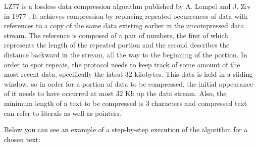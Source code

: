 LZ77 is a lossless data compression algorithm published by A. Lempel and J. Ziv
in 1977 \cite{lz77}. It achieves compression by replacing repeated occurrences
of data with references to a copy of the same data existing earlier in the
uncompressed data stream. The reference is composed of a pair of numbers, the
first of which represents the length of the repeated portion and the second
describes the distance backward in the stream, all the way to the beginning of
the portion. In order to spot repeats, the protocol needs to keep track of some
amount of the most recent data, specifically the latest 32 kilobytes. This data
is held in a sliding window, so in order for a portion of data to be compressed,
the initial appearance of it needs to have occurred at most 32 Kb up the data
stream. Also, the minimum length of a text to be compressed is 3 characters and
compressed text can refer to literals as well as pointers.

Below you can see an example of a step-by-step execution of the algorithm for a
chosen text:

